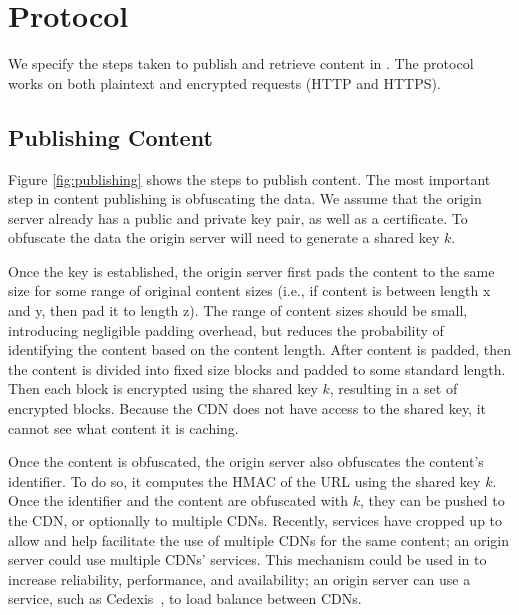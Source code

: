 \section{\system{} Protocol}
\label{sec:protocol}
We specify the 
steps taken to publish and retrieve content in \system{}. The \system{} protocol works 
on both plaintext and encrypted requests (HTTP and HTTPS).

\subsection{Publishing Content}
\label{sec:publish_protocol}
Figure \ref{fig:publishing} shows the steps to publish content. The most important step in content publishing is obfuscating the data.  We assume that the origin server already has a public and private key pair, as well as a certificate.  To obfuscate the data the origin server will need to generate a shared key $k$. 

Once the key is established, the origin server first pads the content to the same size for some 
range of original content sizes (i.e., if content is between length x and y, then pad it to length 
z).  The range of content sizes should be small, introducing negligible padding
overhead, but
reduces the probability of identifying the content based on the content length.  %
After 
content is padded, then the content is divided into fixed size blocks and padded to 
some standard length.  Then each block is encrypted using the shared key $k$, 
resulting in a set of encrypted blocks. Because the CDN does not have access to the shared key, 
it cannot see what content it is caching.  

Once the content is obfuscated, the origin server also obfuscates the content's identifier.  To do so, 
it computes the HMAC of the URL using the shared key $k$.
Once the identifier and the content are obfuscated with $k$, they can be pushed to the CDN, or optionally to multiple 
CDNs.  Recently, services have cropped up to allow and help facilitate the use of multiple CDNs for the same content; an 
origin server could use multiple CDNs' services.  This mechanism could be used in \system{} to increase reliability, 
performance, and availability; an origin server can use a service, such as Cedexis~\cite{cedexis}, to load balance between 
CDNs.  %

